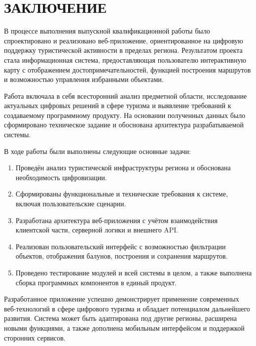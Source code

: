 \section*{ЗАКЛЮЧЕНИЕ}

В процессе выполнения выпускной квалификационной работы было спроектировано и реализовано веб-приложение, ориентированное на цифровую поддержку туристической активности в пределах региона. Результатом проекта стала информационная система, предоставляющая пользователю интерактивную карту с отображением достопримечательностей, функцией построения маршрутов и возможностью управления избранными объектами.

Работа включала в себя всесторонний анализ предметной области, исследование актуальных цифровых решений в сфере туризма и выявление требований к создаваемому программному продукту. На основании полученных данных было сформировано техническое задание и обоснована архитектура разрабатываемой системы.

В ходе работы были выполнены следующие основные задачи:

\begin{enumerate}
\item Проведён анализ туристической инфраструктуры региона и обоснована необходимость цифровизации.
\item Сформированы функциональные и технические требования к системе, включая пользовательские сценарии.
\item Разработана архитектура веб-приложения с учётом взаимодействия клиентской части, серверной логики и внешнего API.
\item Реализован пользовательский интерфейс с возможностью фильтрации объектов, отображения балунов, построения и сохранения маршрутов.
\item Проведено тестирование модулей и всей системы в целом, а также выполнена сборка программных компонентов в единый продукт.
\end{enumerate}

Разработанное приложение успешно демонстрирует применение современных веб-технологий в сфере цифрового туризма и обладает потенциалом дальнейшего развития. Система может быть адаптирована под другие регионы, расширена новыми функциями, а также дополнена мобильным интерфейсом и поддержкой сторонних сервисов.
